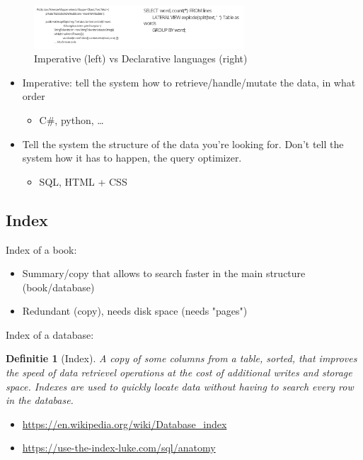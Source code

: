 \documentclass{article}
\newtheorem{theorem}{Definitie}[section]
\begin{document}
\begin{figure}[H]
    \centering
    \includegraphics[width=0.7\textwidth]{imperative-vs-declarative.png}
    \caption{Imperative (left) vs Declarative languages (right)}
\end{figure}

\begin{itemize}
    \item Imperative: tell the system how to retrieve/handle/mutate the data, in what order
    \begin{itemize}
        \item C\#, python, \dots
    \end{itemize}
    \item Tell the system the structure of the data you're looking for. Don't tell the system how it has to happen, the query optimizer.
    \begin{itemize}
        \item SQL, HTML + CSS
    \end{itemize}
\end{itemize}

\subsection{Index}

Index of a book:

\begin{itemize}
    \item Summary/copy that allows to search faster in the main structure (book/database)
    \item Redundant (copy), needs disk space (needs "pages")
\end{itemize}

Index of a database:

\begin{theorem}[Index]
    A copy of some columns from a table, sorted, that improves the speed of data retrievel operations at the cost of additional writes and storage space.
    Indexes are used to quickly locate data without having to search every row in the database.
\end{theorem}

\begin{itemize}
    \item \url{https://en.wikipedia.org/wiki/Database_index}
    \item \url{https://use-the-index-luke.com/sql/anatomy}
\end{itemize}
\end{document}
